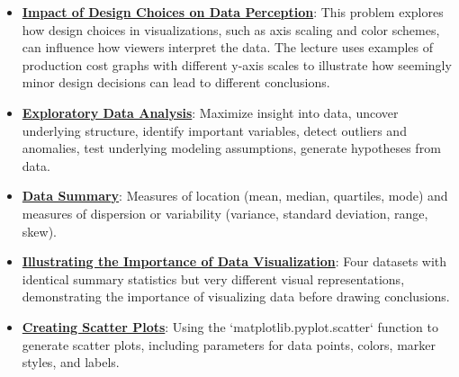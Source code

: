 \documentclass{article}%
\begin{document}
\begin{itemize}[leftmargin=*]
\item \href{https://purdue.brightspace.com/d2l/common/assets/pdfjs-d2l-dist/1.0.14-legacy/web/viewer.html?file=\%2Fcontent\%2Fenforced\%2F1095465-WL.202510.CS24200.LE1\%2F09L1-IntroToVis.pdf\%3Fou\%3D1095465\&lang=en-us\&container=d2l-fileviewer-rendered-pdf\&fullscreen=d2l-fileviewer-rendered-pdf-dialog\&height=667#page=18}{\textbf{Impact of Design Choices on Data Perception}}: This problem explores how design choices in visualizations, such as axis scaling and color schemes, can influence how viewers interpret the data. The lecture uses examples of production cost graphs with different y-axis scales to illustrate how seemingly minor design decisions can lead to different conclusions.%
\end{itemize}%
\begin{itemize}[leftmargin=*]%
\item \href{https://purdue.brightspace.com/d2l/common/assets/pdfjs-d2l-dist/1.0.14-legacy/web/viewer.html?file=\%2Fcontent\%2Fenforced\%2F1095465-WL.202510.CS24200.LE1\%2F10L2-Vis.pdf\%3Fou\%3D1095465\&lang=en-us\&container=d2l-fileviewer-rendered-pdf\&fullscreen=d2l-fileviewer-rendered-pdf-dialog\&height=667#page=3}{\textbf{Exploratory Data Analysis}}: Maximize insight into data, uncover underlying structure, identify important variables, detect outliers and anomalies, test underlying modeling assumptions, generate hypotheses from data.%
\item \href{https://purdue.brightspace.com/d2l/common/assets/pdfjs-d2l-dist/1.0.14-legacy/web/viewer.html?file=\%2Fcontent\%2Fenforced\%2F1095465-WL.202510.CS24200.LE1\%2F10L2-Vis.pdf\%3Fou\%3D1095465\&lang=en-us\&container=d2l-fileviewer-rendered-pdf\&fullscreen=d2l-fileviewer-rendered-pdf-dialog\&height=667#page=5}{\textbf{Data Summary}}: Measures of location (mean, median, quartiles, mode) and measures of dispersion or variability (variance, standard deviation, range, skew).%
\item \href{https://purdue.brightspace.com/d2l/common/assets/pdfjs-d2l-dist/1.0.14-legacy/web/viewer.html?file=\%2Fcontent\%2Fenforced\%2F1095465-WL.202510.CS24200.LE1\%2F10L2-Vis.pdf\%3Fou\%3D1095465\&lang=en-us\&container=d2l-fileviewer-rendered-pdf\&fullscreen=d2l-fileviewer-rendered-pdf-dialog\&height=667#page=6}{\textbf{Illustrating the Importance of Data Visualization}}: Four datasets with identical summary statistics but very different visual representations, demonstrating the importance of visualizing data before drawing conclusions.%
\item \href{https://purdue.brightspace.com/d2l/common/assets/pdfjs-d2l-dist/1.0.14-legacy/web/viewer.html?file=\%2Fcontent\%2Fenforced\%2F1095465-WL.202510.CS24200.LE1\%2F10L2-Vis.pdf\%3Fou\%3D1095465\&lang=en-us\&container=d2l-fileviewer-rendered-pdf\&fullscreen=d2l-fileviewer-rendered-pdf-dialog\&height=667#page=7}{\textbf{Creating Scatter Plots}}: Using the `matplotlib.pyplot.scatter` function to generate scatter plots, including parameters for data points, colors, marker styles, and labels.%

\end{itemize}
\end{document}

